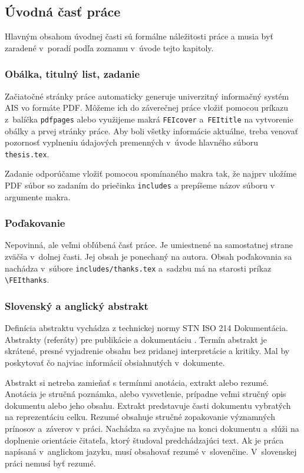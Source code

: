 \documentclass[../../../thesis.tex]{subfiles}
\begin{document}
\subsection{Úvodná časť práce}
Hlavným obsahom úvodnej časti sú formálne náležitosti práce a musia byť zaradené v~poradí podľa zoznamu v~úvode tejto kapitoly.

\subsubsection{Obálka, titulný list, zadanie}
Začiatočné stránky práce automaticky generuje univerzitný
informačný systém AIS vo formáte PDF.
Môžeme ich do záverečnej práce vložiť pomocou príkazu \verb|| z~balíčka \verb|pdfpages|
alebo využijeme makrá \verb|FEIcover| a~\verb|FEItitle| na vytvorenie obálky a prvej
stránky práce.
Aby boli všetky informácie aktuálne,
treba venovať pozornosť vyplneniu údajových
premenných v~úvode hlavného súboru \verb|thesis.tex|.

Zadanie odporúčame vložiť pomocou spomínaného makra
\verb|| tak, že najprv uložíme PDF súbor
so zadaním do priečinka \verb|includes| a prepíšeme
názov súboru v argumente makra.

\subsubsection{Poďakovanie}
Nepovinná, ale veľmi obľúbená časť práce.
Je umiestnené na samostatnej strane zväčša v~dolnej časti.
Jej obsah je ponechaný na autora.
Obsah poďakovania sa nachádza v~súbore
\verb|includes/thanks.tex| a~sadzbu má na starosti
príkaz \verb|\FEIthanks|.

\subsubsection{Slovenský a anglický abstrakt}
Definícia abstraktu vychádza z technickej normy STN ISO 214 Dokumentácia.
Abstrakty (referáty) pre publikácie a dokumentáciu \cite{iso214}.
Termín abstrakt je skrátené, presné vyjadrenie obsahu
bez pridanej interpretácie a kritiky.
Mal by poskytovať čo najviac informácií obsiahnutých v~dokumente.

Abstrakt si netreba zamieňať s termínmi anotácia,
extrakt alebo rezumé.
Anotácia je stručná poznámka, alebo vysvetlenie,
prípadne veľmi stručný opis dokumentu alebo jeho obsahu.
Extrakt predstavuje časti dokumentu vybratých
na reprezentáciu celku.
Rezumé obsahuje stručné zopakovanie významných prínosov
a~záverov v práci.
Nachádza sa zvyčajne na konci dokumentu
a~slúži na doplnenie orientácie čitateľa,
ktorý študoval predchádzajúci text.
Ak je práca napísaná v~anglickom jazyku,
musí obsahovať rezumé v~slovenčine.
V~slovenskej práci nemusí byť rezumé.
\end{document}
